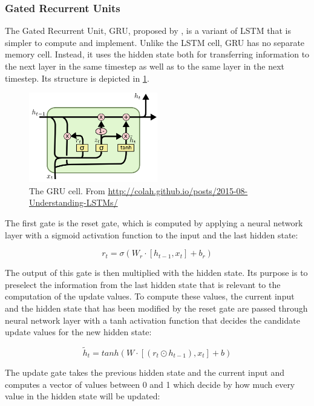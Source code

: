 \documentclass[11pt,a4paper,twoside,openright]{scrbook}
\begin{document}
\subsubsection{Gated Recurrent Units}
The Gated Recurrent Unit, GRU, proposed by \cite{cho}, is a variant of LSTM that is simpler to compute and implement. Unlike the LSTM cell, GRU has no separate memory cell. Instead, it uses the hidden state both for transferring information to the next layer in the same timestep as well as to the same layer in the next timestep. Its structure is depicted in \ref{Figure:GRU}.


\begin{figure}
\centering
\includegraphics[width=0.5\textwidth]{images/GRU.png}
\caption{The GRU cell. \tiny{From \url{http://colah.github.io/posts/2015-08-Understanding-LSTMs/}}}
\label{Figure:GRU}
\end{figure}

The first gate is the reset gate, which is computed by applying a neural network layer with a sigmoid activation function to the input and the last hidden state:

\begin{equation}
r_t = \sigma (W_r \cdot [h_{t-1},x_t] + b_r)
\end{equation}
	
The output of this gate is then multiplied with the hidden state. Its purpose is to preselect the information from the last hidden state that is relevant to the computation of the update values. To compute these values, the current input and the hidden state that has been modified by the reset gate are passed through neural network layer with a tanh activation function that decides the candidate update values for the new hidden state:

\begin{equation}
\tilde h_t = tanh (W \cdot [(r_t \odot h_{t-1}), x_t] + b )
\end{equation}
	
The update gate takes the previous hidden state and the current input and computes a vector of values between 0 and 1 which decide by how much every value in the hidden state will be updated:
\end{document}
